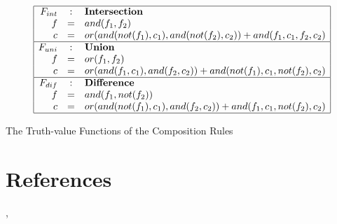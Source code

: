 \begin{table}[htb]
\[\begin{array}{|rcl|} \hline
F_{int} &:& \mbox{\textbf{Intersection}}	\\
f &=& and(f_1, f_2) \\
c &=& or(and(not(f_1), c_1), and(not(f_2), c_2)) + and(f_1, c_1, f_2, c_2) \\
\hline
F_{uni} &:& \mbox{\textbf{Union}} 	\\
f &=& or(f_1, f_2) \\
c &=& or(and(f_1, c_1), and(f_2, c_2)) + and(not(f_1), c_1, not(f_2), c_2) \\
\hline
F_{dif} &:& \mbox{\textbf{Difference}}	 \\
f &=& and(f_1, not(f_2)) \\
c &=& or(and(not(f_1), c_1), and(f_2, c_2)) + and(f_1, c_1, not(f_2), c_2) \\
\hline \end{array}\]
\caption{The Truth-value Functions of the Composition Rules}
\label{NAL-3-Composition-Functions}
\end{table}

\section*{References}

\cite[Chapter 4]{wp:book1}, \cite{wp:unify,wp:agi}
